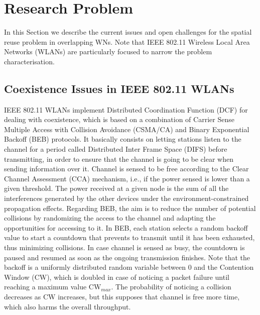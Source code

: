 \documentclass[12pt, a4paper,twoside]{tesi_upf}
\begin{document}
	\chapter{Research Problem}
	\label{section:research_problem}
		In this Section we describe the current issues and open challenges for the spatial reuse problem in overlapping WNs. Note that IEEE 802.11 Wireless Local Area Networks (WLANs) are particularly focused to narrow the problem characterisation.
		
		\section{Coexistence Issues in IEEE 802.11 WLANs}
		\label{section:coexistence_issues}	
			IEEE 802.11 WLANs implement Distributed Coordination Function (DCF) for dealing with coexistence, which is based on a combination of Carrier Sense Multiple Access with Collision Avoidance (CSMA/CA) and Binary Exponential Backoff (BEB) protocols. It basically consists on letting stations listen to the channel for a period called Distributed Inter Frame Space (DIFS) before transmitting, in order to ensure that the channel is going to be clear when sending information over it. Channel is sensed to be free according to the Clear Channel Assessment (CCA) mechanism, i.e., if the power sensed is lower than a given threshold. The power received at a given node is the sum of all the interferences generated by the other devices under the environment-constrained propagation effects. Regarding BEB, the aim is to reduce the number of potential collisions by randomizing the access to the channel and adapting the opportunities for accessing to it. In BEB, each station selects a random backoff value to start a countdown that prevents to transmit until it has been exhausted, thus minimizing collisions. In case channel is sensed as busy, the countdown is paused and resumed as soon as the ongoing transmission finishes. Note that the backoff is a uniformly distributed random variable between 0 and the Contention Window (CW), which is doubled in case of noticing a packet failure until reaching a maximum value $\text{CW}_{max}$. The probability of noticing a collision decreases as CW increases, but this supposes that channel is free more time, which also harms the overall throughput.
					
\end{document}
